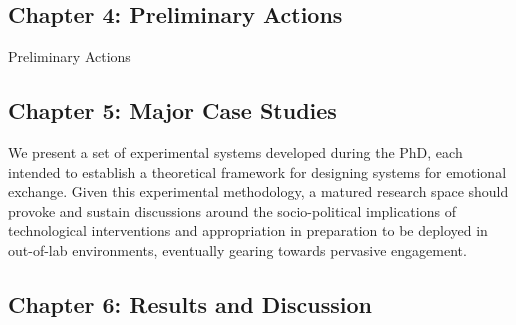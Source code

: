 \subsection{Chapter 4: Preliminary Actions}

Preliminary Actions

\subsection{Chapter 5: Major Case Studies}

We present a set of experimental systems developed during the PhD, each intended to establish a theoretical framework for designing systems for emotional exchange. Given this experimental methodology, a matured research space should provoke and sustain discussions around the socio-political implications of technological interventions and appropriation in preparation to be deployed in out-of-lab environments, eventually gearing towards pervasive engagement.

\subsection{Chapter 6: Results and Discussion}


